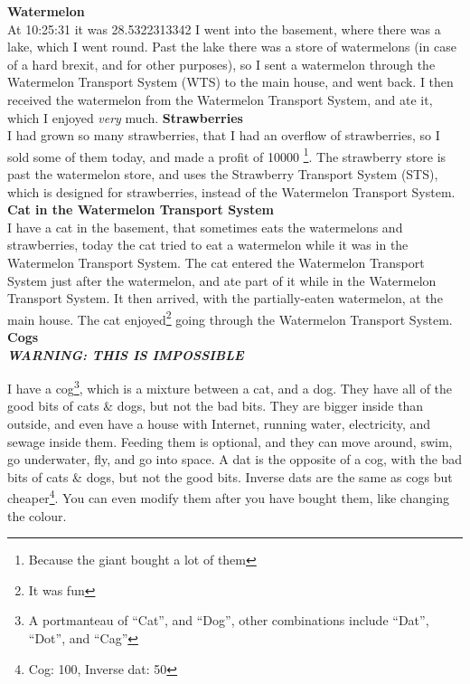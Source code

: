 \documentclass[UTF8]{tufte-book}
\newcommand{\warning}[1]{\textbf{\textit{WARNING: #1}}}
\newcommand{\wts}{WTS\texttrademark}
\newcommand{\WTS}{Watermelon Transport System\texttrademark}
\newcommand{\sts}{STS\texttrademark}
\newcommand{\STS}{Strawberry Transport System\texttrademark}
\newenvironment{entry}[2] %
{\noindent\textbf{#2}\marginnote{#1}\\}{\vspace{0.5cm}}
\begin{document}
\begin{entry}{2020-07-08}{Watermelon}
  At 10:25:31 it was 28.5322313342\celsius\newline
  I went into the basement, where there was a lake, which I went round.
  Past the lake there was a store of watermelons (in case of a hard brexit, and for other purposes),
  so I sent a watermelon through the \WTS{} (\wts) to the main house, and went back.
  I then received the watermelon from the \WTS, and ate it, which I enjoyed \textit{very} much.\newline
\end{entry}
\begin{entry}{2020-07-09}{Strawberries}
  I had grown so many strawberries, that I had an overflow of strawberries, so I sold some of them today,
  and made a profit of \texteuro{}10000 \footnote{Because the giant bought a lot of them}.
  The strawberry store is past the watermelon store, and uses the \STS{} (\sts),
  which is designed for strawberries, instead of the \WTS.\newline
\end{entry}
\begin{entry}{2020-07-10}{Cat in the \WTS}
  I have a cat in the basement, that sometimes eats the watermelons and strawberries,
  today the cat tried to eat a watermelon while it was in the \WTS.
  The cat entered the \WTS{} just after the watermelon, and ate part of it while in the \WTS.
  It then arrived, with the partially-eaten watermelon, at the main house.
  The cat enjoyed\footnote{It was fun} going through the \WTS.\newline
\end{entry}
\begin{entry}{2020-07-11}{Cogs}
  \warning{THIS IS IMPOSSIBLE}
  
  I have a cog\footnote{A portmanteau of ``Cat'', and ``Dog'', other combinations include ``Dat'', ``Dot'', and ``Cag''},
  which is a mixture between a cat, and a dog.
  They have all of the good bits of cats \& dogs, but not the bad bits.
  They are bigger inside than outside, and even have a house with Internet, running water, electricity, and sewage inside them.
  Feeding them is optional, and they can move around, swim, go underwater, fly, and go into space.
  A dat is the opposite of a cog, with the bad bits of cats \& dogs, but not the good bits.
  Inverse dats are the same as cogs but cheaper\footnote{Cog: \texteuro{}100, Inverse dat: \texteuro{}50}.
  You can even modify them after you have bought them, like changing the colour.\newline
\end{entry}
\end{document}
